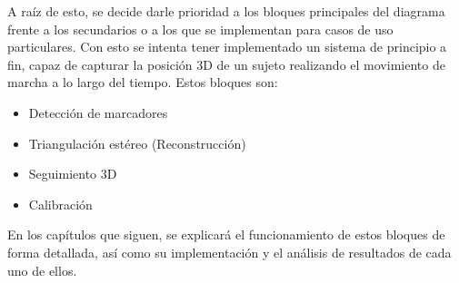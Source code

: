  A raíz de esto, se decide darle prioridad a los bloques principales del diagrama frente a los secundarios o a los que se implementan para casos de uso particulares. Con esto se intenta tener implementado un sistema de principio a fin, capaz de capturar la posición 3D de un sujeto realizando el movimiento de marcha a lo largo del tiempo. Estos bloques son:
 \begin{itemize}
 	\item Detección de marcadores
 	\item Triangulación estéreo (Reconstrucción)
 	\item Seguimiento 3D
 	\item Calibración
 \end{itemize}

En los capítulos que siguen, se explicará el funcionamiento de estos bloques de forma detallada, así como su implementación y el análisis de resultados de cada uno de ellos.